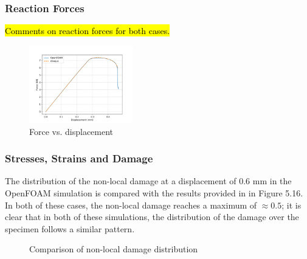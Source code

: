 \documentclass[sn-mathphys,Numbered,draft]{sn-jnl}%
\begin{document}
\subsubsection{Reaction Forces}

\hl{Comments on reaction forces for both cases.}

\begin{figure}[htb]
\begin{center}
	\includegraphics[width=0.4\textwidth]{./Figures/LemaitreCompare/borden/bordenDispForce.png}
\caption{Force vs. displacement}
\label{fig:notchedRoundBAr}
\end{center}
\end{figure}



\subsubsection{Stresses, Strains and Damage}
The distribution of the non-local damage at a displacement of $0.6$ mm in the OpenFOAM simulation is compared with the results provided in \citet{cesar_de_sa_damage_2006} in Figure 5.16. In both of these cases, the non-local damage reaches a maximum of $\approx0.5$; it is clear that in both of these simulations, the distribution of the damage over the specimen follows a similar pattern.

\begin{figure}[htbp]
	\centering
		\qquad
		
		\caption{Comparison of non-local damage distribution}
	\label{label_for_entire_figure}
\end{figure}
\FloatBarrier
\end{document}
